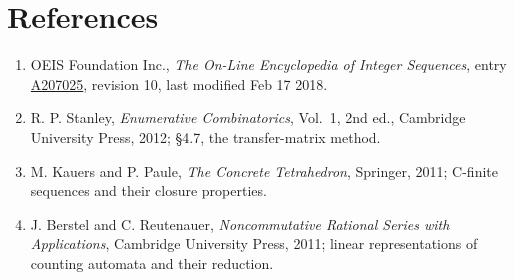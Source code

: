 \documentclass[11pt]{article}
\theoremstyle{definition}
\begin{document}
\section{References}

\begin{enumerate}

\item OEIS Foundation Inc., \emph{The On-Line Encyclopedia of Integer Sequences}, entry \href{https://oeis.org/A207025}{A207025}, revision 10, last modified Feb 17 2018.

\item R. P. Stanley, \emph{Enumerative Combinatorics}, Vol.~1, 2nd ed., Cambridge University Press, 2012; \S4.7, the transfer-matrix method.

\item M. Kauers and P. Paule, \emph{The Concrete Tetrahedron}, Springer, 2011; C-finite sequences and their closure properties.

\item J. Berstel and C. Reutenauer, \emph{Noncommutative Rational Series with Applications}, Cambridge University Press, 2011; linear representations of counting automata and their reduction.

\end{enumerate}
\end{document}
